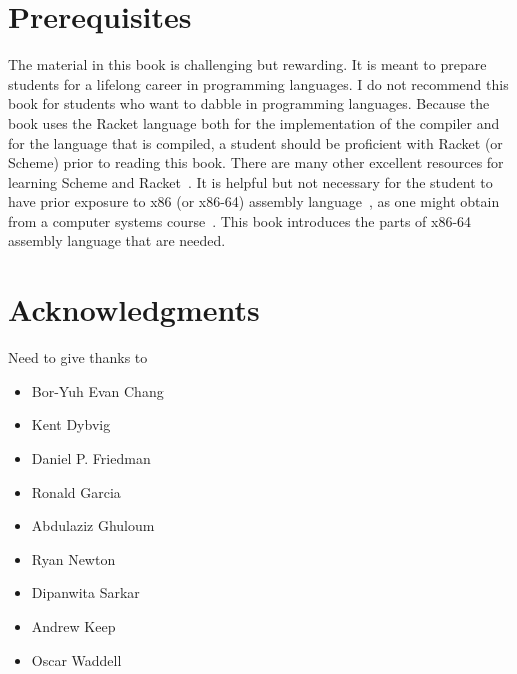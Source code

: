 \documentclass[11pt]{book}
\begin{document}
\section*{Prerequisites}

The material in this book is challenging but rewarding. It is meant to
prepare students for a lifelong career in programming languages.  I do
not recommend this book for students who want to dabble in programming
languages.  Because the book uses the Racket language both for the
implementation of the compiler and for the language that is compiled,
a student should be proficient with Racket (or Scheme) prior to
reading this book. There are many other excellent resources for
learning Scheme and
Racket~\citep{Dybvig:1987aa,Abelson:1996uq,Friedman:1996aa,Felleisen:2001aa,Felleisen:2013aa,Flatt:2014aa}. It
is helpful but not necessary for the student to have prior exposure to
x86 (or x86-64) assembly language~\citep{Intel:2015aa}, as one might
obtain from a computer systems
course~\citep{Bryant:2005aa,Bryant:2010aa}.  This book introduces the
parts of x86-64 assembly language that are needed.



\section*{Acknowledgments}

Need to give thanks to 
\begin{itemize}
\item Bor-Yuh Evan Chang
\item Kent Dybvig
\item Daniel P. Friedman
\item Ronald Garcia
\item Abdulaziz Ghuloum
\item Ryan Newton
\item Dipanwita Sarkar
\item Andrew Keep
\item Oscar Waddell
\end{itemize}
\end{document}

